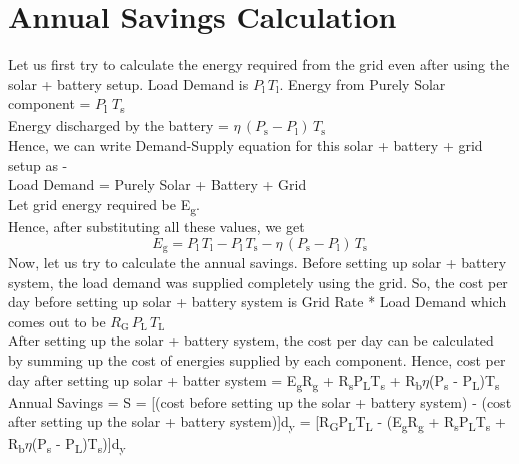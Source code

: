 \documentclass{article}
\newcommand{\PL}{\ensuremath{P_\text{l}}}
\newcommand{\TL}{\ensuremath{T_\text{l}}}
\begin{document}
\section{Annual Savings Calculation}
Let us first try to calculate the energy required from the grid even after using the solar + battery setup.
Load Demand is $\PL \, \TL$.
Energy from Purely Solar component = \(P\)\textsubscript{l} \(T\)\textsubscript{s}\\
Energy discharged by the battery = $\eta \, (P_\text{s} - P_\text{l}) \, T_\text{s}$\\
\newline
Hence, we can write Demand-Supply equation for this solar + battery + grid setup as - \\
Load Demand = Purely Solar + Battery + Grid\\
\newline
Let grid energy required be E\textsubscript{g}.\\
Hence, after substituting all these values, we get\\
\begin{equation}
   E_\text{g} = P_\text{l} \, T_\text{l} - P_\text{l} \, T_\text{s} - \eta \, (P_\text{s} - P_\text{l}) \, T_\text{s} 
\end{equation}
\newline
Now, let us try to calculate the annual savings.
Before setting up solar + battery system, the load demand was supplied completely using the grid.
So, the cost per day before setting up solar + battery system is Grid Rate * Load Demand which comes out to be $R_\text{G} \, P_\text{L} \, T_\text{L}$\\
\newline
After setting up the solar + battery system, the cost per day can be calculated by summing up the cost of energies supplied by each component.
Hence, cost per day after setting up solar + batter system = E\textsubscript{g}R\textsubscript{g} + R\textsubscript{s}P\textsubscript{L}T\textsubscript{s} + R\textsubscript{b}\(\eta\)(P\textsubscript{s} - P\textsubscript{L})T\textsubscript{s}\\
\newline
\newline
Annual Savings = S = [(cost before setting up the solar + battery system) - (cost after setting up the solar + battery system)]d\textsubscript{y} = [R\textsubscript{G}P\textsubscript{L}T\textsubscript{L} - (E\textsubscript{g}R\textsubscript{g} + R\textsubscript{s}P\textsubscript{L}T\textsubscript{s} + R\textsubscript{b}\(\eta\)(P\textsubscript{s} - P\textsubscript{L})T\textsubscript{s})]d\textsubscript{y} \\
\end{document}
